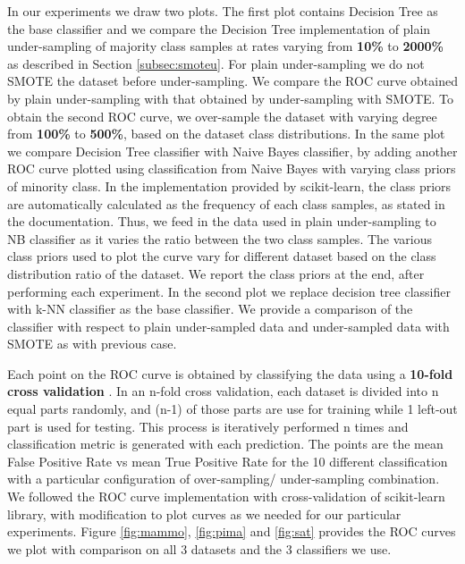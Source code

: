 \documentclass[10pt,journal,compsoc]{IEEEtran}
\begin{document}
In our experiments we draw two plots. 
The first plot contains Decision Tree as the base classifier and we compare the Decision Tree implementation of plain under-sampling of majority class samples at rates varying from \textbf{10\%} to \textbf{2000\%} as described in Section \ref{subsec:smoteu}. 
For plain under-sampling we do not SMOTE the dataset before under-sampling.
We compare the ROC curve obtained by plain under-sampling with that obtained by under-sampling with SMOTE.
To obtain the second ROC curve, we over-sample the dataset with varying degree from \textbf{100\%} to \textbf{500\%}, based on the dataset class distributions.
In the same plot we compare Decision Tree classifier with Naive Bayes classifier, by adding another ROC curve plotted using classification from Naive Bayes with varying class priors of minority class.
In the implementation provided by scikit-learn, the class priors are automatically calculated as the frequency of each class samples, as stated in the documentation\cite{nbayes}.
Thus, we feed in the data used in plain under-sampling to NB classifier as it varies the ratio between the two class samples. 
The various class priors used to plot the curve vary for different dataset based on the class distribution ratio of the dataset.
We report the class priors at the end, after performing each experiment.
In the second plot we replace decision tree classifier with k-NN classifier as the base classifier. 
We provide a comparison of the classifier with respect to plain under-sampled data and under-sampled data with SMOTE as with previous case.

Each point on the ROC curve is obtained by classifying the data using a \textbf{10-fold cross validation} .
In an n-fold cross validation, each dataset is divided into n equal parts randomly, and (n-1) of those parts are use for training while 1 left-out part is used for testing.
This process is iteratively performed n times and classification metric is generated with each prediction.
The points are the mean False Positive Rate vs mean True Positive Rate for the 10 different classification with a particular configuration of over-sampling/ under-sampling combination.
We followed the ROC curve implementation with cross-validation of scikit-learn library\cite{roc}, with modification to plot curves as we needed for our particular experiments.
Figure \ref{fig:mammo}, \ref{fig:pima} and \ref{fig:sat} provides the ROC curves we plot with comparison on all 3 datasets and the 3 classifiers we use. 
\end{document}
